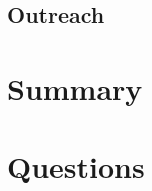\documentclass[11pt, aspectratio=169]{beamer}
\begin{document}
\subsection{Outreach}


\section{Summary}

\section{Questions}
\end{document}
